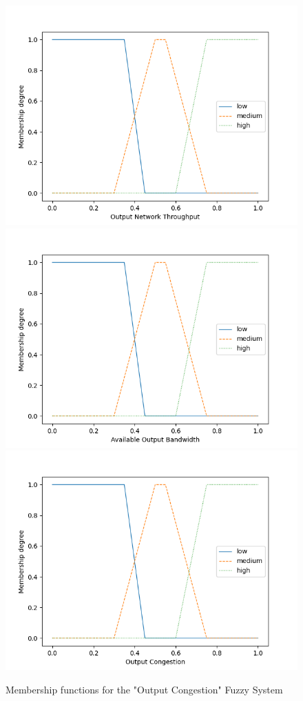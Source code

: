 \begin{figure}[!htb]
    \centering
    \hspace*{-1cm}

    \includegraphics[width=.33\textwidth]{images/plots/OutNetThroughput.png}\hfill
    \includegraphics[width=.33\textwidth]{images/plots/AvailOutBandwidth.png}\hfill
    \includegraphics[width=.33\textwidth]{images/plots/OutCongestion.png}

    \hspace*{-1cm}
    \caption{Membership functions for the "Output Congestion" Fuzzy System}
    \label{fig:FS_OUTC_FSETS}
\end{figure}

